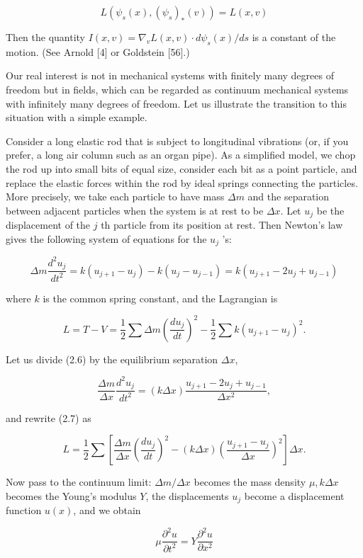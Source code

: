 \documentclass[10pt, letterpaper]{article}
\begin{document}
$$
L\left(\psi_{s}(x),\left(\psi_{s}\right)_{*}(v)\right)=L(x, v)
$$

Then the quantity $I(x, v)=\nabla_{v} L(x, v) \cdot d \psi_{s}(x) / d s$ is a constant of the motion. (See Arnold [4] or Goldstein [56].)

Our real interest is not in mechanical systems with finitely many degrees of freedom but in fields, which can be regarded as continuum mechanical systems with infinitely many degrees of freedom. Let us illustrate the transition to this situation with a simple example.

Consider a long elastic rod that is subject to longitudinal vibrations (or, if you prefer, a long air column such as an organ pipe). As a simplified model, we chop the rod up into small bits of equal size, consider each bit as a point particle, and replace the elastic forces within the rod by ideal springs connecting the particles. More precisely, we take each particle to have mass $\Delta m$ and the separation between adjacent particles when the system is at rest to be $\Delta x$. Let $u_{j}$ be the displacement of the $j$ th particle from its position at rest. Then Newton's law gives the following system of equations for the $u_{j}$ 's:

$$
\Delta m \frac{d^{2} u_{j}}{d t^{2}}=k\left(u_{j+1}-u_{j}\right)-k\left(u_{j}-u_{j-1}\right)=k\left(u_{j+1}-2 u_{j}+u_{j-1}\right)
$$

where $k$ is the common spring constant, and the Lagrangian is

$$
L=T-V=\frac{1}{2} \sum \Delta m\left(\frac{d u_{j}}{d t}\right)^{2}-\frac{1}{2} \sum k\left(u_{j+1}-u_{j}\right)^{2} .
$$

Let us divide (2.6) by the equilibrium separation $\Delta x$,

$$
\frac{\Delta m}{\Delta x} \frac{d^{2} u_{j}}{d t^{2}}=(k \Delta x) \frac{u_{j+1}-2 u_{j}+u_{j-1}}{\Delta x^{2}},
$$

and rewrite (2.7) as

$$
L=\frac{1}{2} \sum\left[\frac{\Delta m}{\Delta x}\left(\frac{d u_{j}}{d t}\right)^{2}-(k \Delta x)\left(\frac{u_{j+1}-u_{j}}{\Delta x}\right)^{2}\right] \Delta x .
$$

Now pass to the continuum limit: $\Delta m / \Delta x$ becomes the mass density $\mu, k \Delta x$ becomes the Young's modulus $Y$, the displacements $u_{j}$ become a displacement function $u(x)$, and we obtain

$$
\mu \frac{\partial^{2} u}{\partial t^{2}}=Y \frac{\partial^{2} u}{\partial x^{2}}
$$
\end{document}
